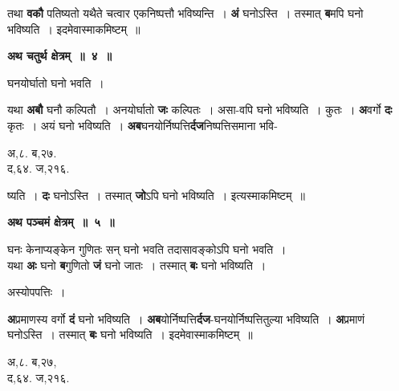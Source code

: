 \documentclass[11pt, openany]{book}
\begin{document}
\noindent तथा \textbf{वकौ} पतिष्यतो यथैते चत्वार एकनिष्पत्तौ भविष्यन्ति~। \textbf{अं} घनोऽस्ति~। तस्मात् \textbf{ब}मपि घनो भविष्यति~। इदमेवास्माकमिष्टम्~॥ 
\vspace{2mm}

\begin{center}
\textbf{\large अथ चतुर्थ क्षेत्रम्~॥~४~॥}
\end{center}

 {\ab घनयोर्घातो घनो भवति~। }

\begin{flushleft}
\begin{minipage}[t]{0.7\textwidth}
\hspace{4mm}  यथा \textbf{अबौ} घनौ कल्पितौ~। अनयोर्घातो \textbf{जः} कल्पितः~। असा-वपि घनो भविष्यति~। कुतः~। \textbf{अ}वर्गो \textbf{दः} कृतः~। अयं घनो भविष्यति~। \textbf{अब}घनयोर्निष्पत्ति\textbf{र्दज}निष्पत्तिसमाना भवि-
\end{minipage} 
\hfill
\begin{minipage}[t]{0.2\textwidth}
अ,८. ब,२७.\\
द,६४. ज,२१६.
\end{minipage}
\end{flushleft}
\vspace{-3mm}

\noindent ष्यति~। \textbf{दः} घनोऽस्ति~। तस्मात् \textbf{जो}ऽपि घनो भविष्यति~। इत्यस्माकमिष्टम्~॥
\vspace{2mm}

\begin{center}
\textbf{\large अथ पञ्चमं क्षेत्रम्~॥~५~॥ }
\end{center}

{\ab घनः केनाप्यङ्केन गुणितः सन् घनो भवति तदासावङ्कोऽपि घनो भवति~। }\\

 यथा \textbf{अः} घनो \textbf{ब}गुणितो \textbf{जं} घनो जातः~। तस्मात् \textbf{बः} घनो भविष्यति~। 
 
\begin{center}
अस्योपपत्तिः~।
\end{center}

\begin{flushleft}
\begin{minipage}[t]{0.7\textwidth}
\hspace{4mm} \textbf{अ}प्रमाणस्य वर्गो \textbf{दं} घनो भविष्यति~। \textbf{अब}योर्निष्पत्ति\textbf{र्दज}-घनयोर्निष्पत्तितुल्या भविष्यति~। \textbf{अ}प्रमाणं घनोऽस्ति~। तस्मात् \textbf{बः} घनो भविष्यति~। इदमेवास्माकमिष्टम्~॥ 
\end{minipage} 
\hfill
\begin{minipage}[t]{0.2\textwidth}
अ,८. ब,२७,\\
द,६४. ज,२१६.
\end{minipage}
\end{flushleft}
\vspace{-2mm}
\end{document}
